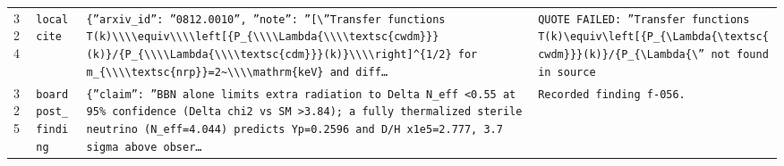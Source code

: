 \documentclass[11pt,a4paper]{article}
\begin{document}
\begin{longtable}{@{}p{}p{}p{}p{}@{}}
324 & \texttt{local}\newline\texttt{cite} & \texttt{\{''arxiv\_\allowbreak{}id'':\allowbreak{} ''0812.0010'',\allowbreak{} ''note'':\allowbreak{} ''[\textbackslash{}\allowbreak{}''Transfer functions T(k)\allowbreak{}\textbackslash{}\allowbreak{}\textbackslash{}\allowbreak{}\textbackslash{}\allowbreak{}\textbackslash{}\allowbreak{}equiv\textbackslash{}\allowbreak{}\textbackslash{}\allowbreak{}\textbackslash{}\allowbreak{}\textbackslash{}\allowbreak{}left[\{P\_\allowbreak{}\{\textbackslash{}\allowbreak{}\textbackslash{}\allowbreak{}\textbackslash{}\allowbreak{}\textbackslash{}\allowbreak{}Lambda\{\textbackslash{}\allowbreak{}\textbackslash{}\allowbreak{}\textbackslash{}\allowbreak{}\textbackslash{}\allowbreak{}textsc\{cwdm\}\allowbreak{}\}\allowbreak{}\}\allowbreak{}(k)\allowbreak{}\}\allowbreak{}/\allowbreak{}\{P\_\allowbreak{}\{\textbackslash{}\allowbreak{}\textbackslash{}\allowbreak{}\textbackslash{}\allowbreak{}\textbackslash{}\allowbreak{}Lambda\{\textbackslash{}\allowbreak{}\textbackslash{}\allowbreak{}\textbackslash{}\allowbreak{}\textbackslash{}\allowbreak{}textsc\{cdm\}\allowbreak{}\}\allowbreak{}\}\allowbreak{}(k)\allowbreak{}\}\allowbreak{}\textbackslash{}\allowbreak{}\textbackslash{}\allowbreak{}\textbackslash{}\allowbreak{}\textbackslash{}\allowbreak{}right]\allowbreak{}\textasciicircum{}\allowbreak{}\{1/\allowbreak{}2\}\allowbreak{} for m\_\allowbreak{}\{\textbackslash{}\allowbreak{}\textbackslash{}\allowbreak{}\textbackslash{}\allowbreak{}\textbackslash{}\allowbreak{}textsc\{nrp\}\allowbreak{}\}\allowbreak{}=\allowbreak{}2\textasciitilde{}\allowbreak{}\textbackslash{}\allowbreak{}\textbackslash{}\allowbreak{}\textbackslash{}\allowbreak{}\textbackslash{}\allowbreak{}mathrm\{keV\}\allowbreak{} and diff\ldots{}\allowbreak{}} & \texttt{QUOTE FAILED:\allowbreak{} ''Transfer functions T(k)\allowbreak{}\textbackslash{}\allowbreak{}equiv\textbackslash{}\allowbreak{}left[\{P\_\allowbreak{}\{\textbackslash{}\allowbreak{}Lambda\{\textbackslash{}\allowbreak{}textsc\{cwdm\}\allowbreak{}\}\allowbreak{}\}\allowbreak{}(k)\allowbreak{}\}\allowbreak{}/\allowbreak{}\{P\_\allowbreak{}\{\textbackslash{}\allowbreak{}Lambda\{\textbackslash{}\allowbreak{}'' not found in source} \\
325 & \texttt{board}\newline\texttt{post\_\allowbreak{}finding} & \texttt{\{''claim'':\allowbreak{} ''BBN alone limits extra radiation to Delta N\_\allowbreak{}eff \textless{}\allowbreak{}0.55 at 95\% confidence (Delta chi2 vs SM \textgreater{}\allowbreak{}3.84)\allowbreak{};\allowbreak{} a fully thermalized sterile neutrino (N\_\allowbreak{}eff=\allowbreak{}4.044)\allowbreak{} predicts Yp=\allowbreak{}0.2596 and D/\allowbreak{}H x1e5=\allowbreak{}2.777,\allowbreak{} 3.7 sigma above obser\ldots{}\allowbreak{}} & \texttt{Recorded finding f-056.} \\

\end{longtable}
\end{document}
